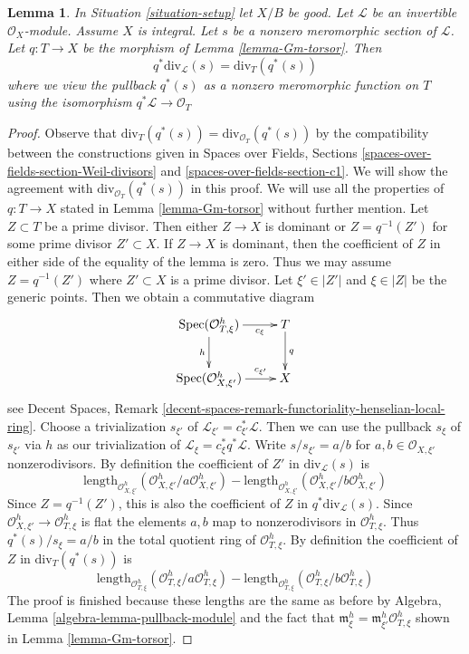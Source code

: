 \documentclass{stacks-project}
\theoremstyle{plain}
\newtheorem{lemma}[subsection]{Lemma}
\theoremstyle{definition}
\theoremstyle{remark}
\numberwithin{equation}{subsection}
\def\Spec{\mathop{\mathrm{Spec}}}
\begin{document}
\begin{lemma}
\label{lemma-Gm-torsor-divisor-meromorphic-section}
In Situation \ref{situation-setup} let $X/B$ be good.
Let $\mathcal{L}$ be an invertible $\mathcal{O}_X$-module.
Assume $X$ is integral. Let $s$ be a nonzero meromorphic
section of $\mathcal{L}$. Let $q : T \to X$ be the morphism
of Lemma \ref{lemma-Gm-torsor}. Then
$$
q^*\text{div}_\mathcal{L}(s) = \text{div}_T(q^*(s))
$$
where we view the pullback $q^*(s)$
as a nonzero meromorphic function on $T$
using the isomorphism $q^*\mathcal{L} \to \mathcal{O}_T$
\end{lemma}

\begin{proof}
Observe that $\text{div}_T(q^*(s)) = \text{div}_{\mathcal{O}_T}(q^*(s))$
by the compatibility between the constructions given in
Spaces over Fields, Sections
\ref{spaces-over-fields-section-Weil-divisors} and
\ref{spaces-over-fields-section-c1}.
We will show the agreement with $\text{div}_{\mathcal{O}_T}(q^*(s))$
in this proof.
We will use all the properties of $q : T \to X$ stated in
Lemma \ref{lemma-Gm-torsor} without further mention.
Let $Z \subset T$ be a prime divisor.
Then either $Z \to X$ is dominant or $Z = q^{-1}(Z')$ for some
prime divisor $Z' \subset X$.
If $Z \to X$ is dominant, then the coefficient of $Z$ in
either side of the equality of the lemma is zero.
Thus we may assume $Z = q^{-1}(Z')$ where $Z' \subset X$
is a prime divisor.
Let $\xi' \in |Z'|$ and $\xi \in |Z|$ be the generic points.
Then we obtain a commutative diagram
$$
\xymatrix{
\Spec(\mathcal{O}_{T, \xi}^h) \ar[r]_-{c_\xi} \ar[d]_h & T \ar[d]^q \\
\Spec(\mathcal{O}_{X, \xi'}^h) \ar[r]^-{c_{\xi'}} & X
}
$$
see Decent Spaces, Remark
\ref{decent-spaces-remark-functoriality-henselian-local-ring}.
Choose a trivialization $s_{\xi'}$ of
$\mathcal{L}_{\xi'} = c_{\xi'}^*\mathcal{L}$.
Then we can use the pullback $s_\xi$ of $s_{\xi'}$ via $h$
as our trivialization of $\mathcal{L}_\xi = c_\xi^* q^*\mathcal{L}$.
Write $s/s_{\xi'} = a/b$ for $a, b \in \mathcal{O}_{X, \xi'}$ nonzerodivisors.
By definition the coefficient of $Z'$ in
$\text{div}_\mathcal{L}(s)$ is
$$
\text{length}_{\mathcal{O}_{X, \xi'}^h}(
\mathcal{O}_{X, \xi'}^h/a \mathcal{O}_{X, \xi'}^h)
-
\text{length}_{\mathcal{O}_{X, \xi'}^h}(
\mathcal{O}_{X, \xi'}^h/b \mathcal{O}_{X, \xi'}^h)
$$
Since $Z = q^{-1}(Z')$, this is also the coefficient of $Z$ in
$q^*\text{div}_\mathcal{L}(s)$. Since
$\mathcal{O}_{X, \xi'}^h \to \mathcal{O}_{T, \xi}^h$
is flat the elements $a, b$ map to nonzerodivisors in
$\mathcal{O}_{T, \xi}^h$. Thus $q^*(s)/s_\xi = a/b$ in the total quotient
ring of $\mathcal{O}_{T, \xi}^h$. By definition the coefficient of
$Z$ in $\text{div}_T(q^*(s))$ is
$$
\text{length}_{\mathcal{O}_{T, \xi}^h}(
\mathcal{O}_{T, \xi}^h/a \mathcal{O}_{T, \xi}^h)
-
\text{length}_{\mathcal{O}_{T, \xi}^h}(
\mathcal{O}_{T, \xi}^h/b \mathcal{O}_{T, \xi}^h)
$$
The proof is finished because these lengths are the same as before
by Algebra, Lemma \ref{algebra-lemma-pullback-module} and the
fact that $\mathfrak m_\xi^h = \mathfrak m_{\xi'}^h\mathcal{O}_{T, \xi}^h$
shown in Lemma \ref{lemma-Gm-torsor}.
\end{proof}
\end{document}
